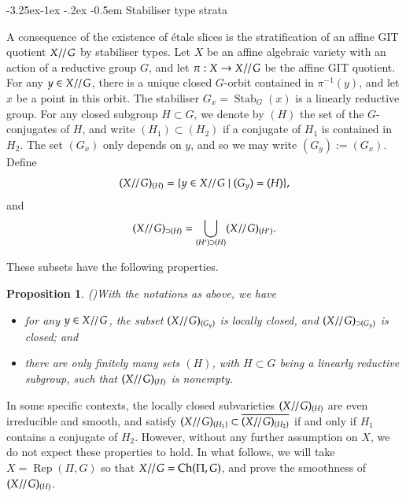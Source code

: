 \documentclass[11pt,oneside,dvipsnames]{amsart}
\makeatletter
\renewcommand\subsection{\@startsection{subsection}{3}{\z@}%
                                     {-3.25ex\@plus -1ex \@minus -.2ex}%
                                     {-0.5em}%
                                     {\normalfont\normalsize\bfseries}}
\theoremstyle{plain}
\newtheorem{Prop}[Thm]{Proposition}
\theoremstyle{definition}
\theoremstyle{named}
\DeclareMathOperator{\Ch}{Ch}
\DeclareMathOperator{\Rep}{Rep}
\DeclareMathOperator{\Stab}{Stab}
\DeclareMathOperator{\ds}{\!/\mkern-2mu/\mkern-2mu}
\makeatother
\begin{document}
\subsection{Stabiliser type strata}\label{subsec-stab-strata}\hfill

A consequence of the existence of \'etale slices is the stratification of an affine GIT quotient $X\ds G$ by stabiliser types. Let $X$ be an affine algebraic variety with an action of a reductive group $G$, and let $\pi:X\rightarrow X\ds G$ be the affine GIT quotient. For any $y\in X\ds G$, there is a unique closed $G$-orbit contained in $\pi^{-1}(y)$, and let $x$ be a point in this orbit. The stabiliser $G_x=\Stab_G(x)$ is a linearly reductive group. For any closed subgroup $H\subset G$, we denote by $(H)$ the set of the $G$-conjugates of $H$, and write $(H_1)\subset(H_2)$ if a conjugate of $H_1$ is contained in $H_2$. The set $(G_x)$ only depends on $y$, and so we may write $(G_y):=(G_x)$. Define
$$
(X\ds G)_{(H)}=\{y\in X\ds G\mid (G_y)=(H)\},
$$
and
$$
(X\ds G)_{\supset(H)}=\bigcup_{(H')\supset(H)}(X\ds G)_{(H')}.
$$

These subsets have the following properties.
\begin{Prop}(\cite[Proposition 2.4]{DZ})\label{Prop-DZ}
With the notations as above, we have
\begin{itemize}
\item[(i)] for any $y\in X\ds G$, the subset $(X\ds G)_{(G_y)}$ is locally closed, and $(X\ds G)_{\supset(G_y)}$ is closed; and
\item[(ii)] there are only finitely many sets $(H)$, with $H\subset G$ being a linearly reductive subgroup, such that $(X\ds G)_{(H)}$ is nonempty.
\end{itemize}
\end{Prop}

In some specific contexts, the locally closed subvarieties $(X\ds G)_{(H)}$ are even irreducible and smooth, and satisfy $(X\ds G)_{(H_1)}\subset\overline{(X\ds G)_{(H_2)}}$ if and only if $H_1$ contains a conjugate of $H_2$. However, without any further assumption on $X$, we do not expect these properties to hold. In what follows, we will take $X=\Rep(\Pi,G)$ so that $X\ds G=\Ch(\Pi,G)$, and prove the smoothness of $(X\ds G)_{(H)}$.
\end{document}
